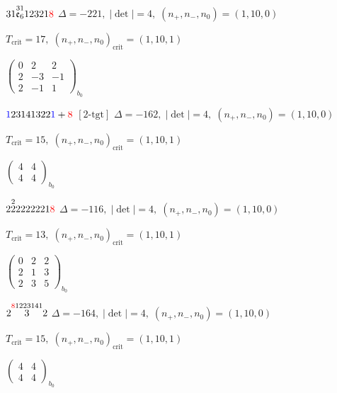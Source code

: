 \documentclass[10pt]{article}
\begin{document}
$31\overset{31}{\mathfrak{e}_6}12321\textcolor{red}{8}$ \quad $\Delta=-221,\; |\det|=4,\; (n_+,n_-,n_0)=(1,10,0)$

\hspace{1em}$T_{\text{crit}}=17,\; (n_+,n_-,n_0)_{\text{crit}}=(1,10,1)$

\hspace{2em}$\left(\begin{smallmatrix}0 & 2 & 2 \\ 2 & -3 & -1 \\ 2 & -1 & 1\end{smallmatrix}\right)_{\!b_0}$

\smallskip

$\textcolor{blue}{1}23141322\textcolor{blue}{1}+\textcolor{red}{8}$ $\scriptstyle [2\text{-tgt}]$ \quad $\Delta=-162,\; |\det|=4,\; (n_+,n_-,n_0)=(1,10,0)$

\hspace{1em}$T_{\text{crit}}=15,\; (n_+,n_-,n_0)_{\text{crit}}=(1,10,1)$

\hspace{2em}$\left(\begin{smallmatrix}4 & 4 \\ 4 & 4\end{smallmatrix}\right)_{\!b_0}$

\smallskip

$2\overset{2}{2}2222221\textcolor{red}{8}$ \quad $\Delta=-116,\; |\det|=4,\; (n_+,n_-,n_0)=(1,10,0)$

\hspace{1em}$T_{\text{crit}}=13,\; (n_+,n_-,n_0)_{\text{crit}}=(1,10,1)$

\hspace{2em}$\left(\begin{smallmatrix}0 & 2 & 2 \\ 2 & 1 & 3 \\ 2 & 3 & 5\end{smallmatrix}\right)_{\!b_0}$

\smallskip

$2\overset{\textcolor{red}{8}1223141}{3}2$ \quad $\Delta=-164,\; |\det|=4,\; (n_+,n_-,n_0)=(1,10,0)$

\hspace{1em}$T_{\text{crit}}=15,\; (n_+,n_-,n_0)_{\text{crit}}=(1,10,1)$

\hspace{2em}$\left(\begin{smallmatrix}4 & 4 \\ 4 & 4\end{smallmatrix}\right)_{\!b_0}$
\end{document}
